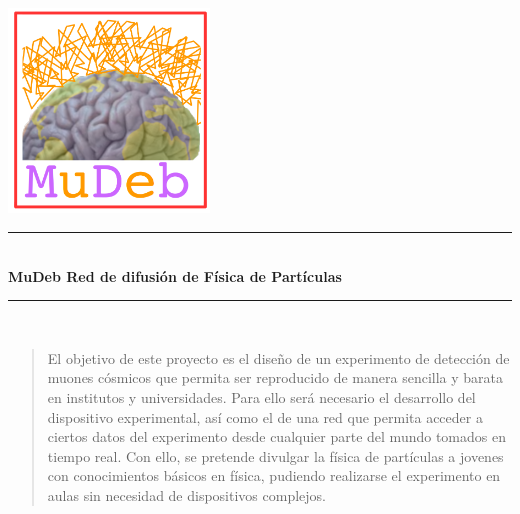 \documentclass[11pt]{extarticle}
\newcommand{\mudeb}{\textbf{MuDeb} }
\begin{document}

	\begin{titlepage}
		\begin{center}

			\vspace{-10cm}

			\includegraphics[width=0.4\textwidth]{Fotos/Logo/logoFinal.png}\\[1cm]



			\rule{\linewidth}{0.5mm} \\[0.4cm]
			{\bfseries \Huge{\mudeb} \huge Red de difusión de Física de Partículas \\[0.4cm] }
			\rule{\linewidth}{0.5mm} \\[1.5cm]

			\begin{abstract}

				\noindent%

					El objetivo de este proyecto es el diseño de un experimento de detección de muones cósmicos que permita ser reproducido de manera sencilla y barata en institutos y universidades. Para ello será necesario el desarrollo del dispositivo experimental, así como el de una red que permita acceder a ciertos datos del experimento desde cualquier parte del mundo tomados en tiempo real. Con ello, se pretende divulgar la física de partículas a jovenes con conocimientos básicos en física, pudiendo realizarse el experimento en aulas sin necesidad de dispositivos complejos.

			\end{abstract}


\end{center}
\end{titlepage}
\end{document}
